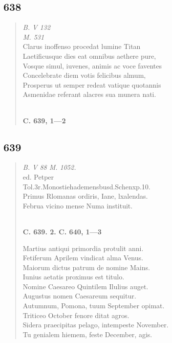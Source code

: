\documentclass[11pt, a4paper]{report}
\begin{document}
            \subsection*{638}
      \begin{verse}
      \textit{B. V 132} \\ \textit{M. 531} \\ Clarus inoffenso procedat lumine Titan \\ Laetificusque dies eat omnibus aethere pure, \\ Vosque simul, iuvenes, animis ac voce faventes \\ Concelebrate diem votis felicibus almum, \\ Prosperus ut semper redeat vatique quotannis \\ Asmenidae referant alacres sua munera nati. \\ 
        ﻿\pagebreak 
     \marginpar{[105]} \begin{center} \textbf{C. 639, 1—2} \end{center}
      \end{verse}
  
            \subsection*{639}
      \begin{verse}
      \textit{B. V 88 M. 1052.} \\ ed. Petper \\ Tol.3r.Monostiehademensbusd.Schenxp.10. \\ Primus Rlomanas ordiris, Iane, lxalendas. \\ Februa vicino mense Numa instituit. \\ 
        ﻿\pagebreak 
    \begin{center} \textbf{C. 639. 2. C. 640, 1—3} \end{center} \marginpar{[106]} Martius antiqui primordia protulit anni. \\ Fetiferum Aprilem vindicat alma Venus. \\ Maiorum dictus patrum de nomine Mains. \\ Iunius aetatis proximus est titulo. \\ Nomine Caesareo Quintilem Ilulius auget. \\ Augustus nomen Caesareum sequitur. \\ Autumnum, Pomona, tuum September opimat. \\ Triticeo October fenore ditat agros. \\ Sidera praecipitas pelago, intempeste November. \\ Tu genialem hiemem, feste December, agis. \\ 
      \end{verse}
  
\end{document}
